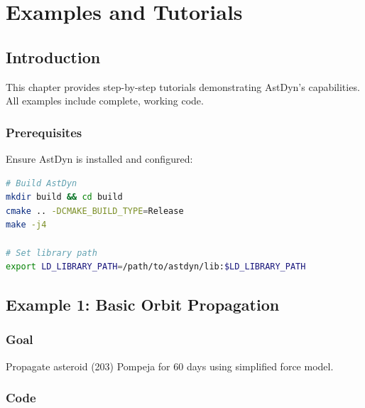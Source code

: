 \chapter{Examples and Tutorials}
\label{ch:examples}

\section{Introduction}

This chapter provides step-by-step tutorials demonstrating AstDyn's capabilities. All examples include complete, working code.

\subsection{Prerequisites}

Ensure AstDyn is installed and configured:

\begin{lstlisting}[language=bash]
# Build AstDyn
mkdir build && cd build
cmake .. -DCMAKE_BUILD_TYPE=Release
make -j4

# Set library path
export LD_LIBRARY_PATH=/path/to/astdyn/lib:$LD_LIBRARY_PATH
\end{lstlisting}

\section{Example 1: Basic Orbit Propagation}

\subsection{Goal}

Propagate asteroid (203) Pompeja for 60 days using simplified force model.

\subsection{Code}

